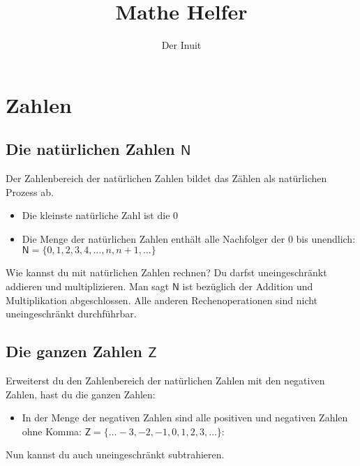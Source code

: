 \documentclass{scrreprt}
\author{Der Inuit}
\title{Mathe Helfer}
\begin{document}
\maketitle
\tableofcontents

% 

\section{Zahlen}\label{Zahlen}
\subsection{Die natürlichen Zahlen $\mathsf{N}$}\label{Die natürlichen Zahlen}
Der Zahlenbereich der natürlichen Zahlen bildet das Zählen als natürlichen Prozess ab.
\begin{itemize}
    \item Die kleinste natürliche Zahl ist die 0
    \item Die Menge der natürlichen Zahlen enthält alle Nachfolger der 0 bis unendlich: $\mathsf{N}=\{0,1,2,3,4,…,n,n+1,…\}$
\end{itemize}
Wie kannst du mit natürlichen Zahlen rechnen? Du darfst uneingeschränkt addieren und multiplizieren. Man sagt $\mathsf{N}$
 ist bezüglich der Addition und Multiplikation abgeschlossen.
Alle anderen Rechenoperationen sind nicht uneingeschränkt durchführbar.
\subsection{Die ganzen Zahlen $\mathsf{Z}$}\label{Die ganzen Zahlen}
Erweiterst du den Zahlenbereich der natürlichen Zahlen mit den negativen Zahlen, hast du die ganzen Zahlen:
\begin{itemize}
    \item In der Menge der negativen Zahlen sind alle positiven und negativen Zahlen ohne Komma: $\mathsf{Z}=\{…-3,-2,-1,0,1,2,3,…\}$: 
\end{itemize}
Nun kannst du auch uneingeschränkt subtrahieren.
\end{document}
